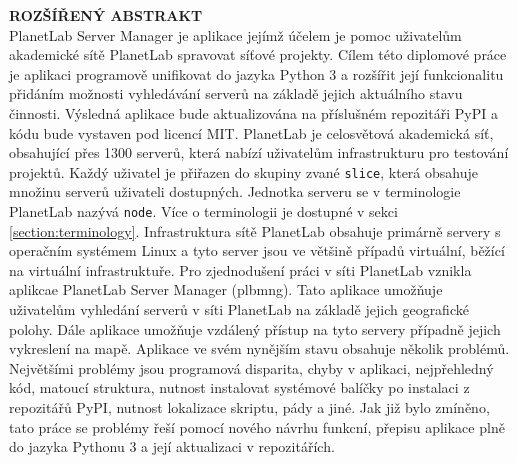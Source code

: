 \documentclass[%
  12pt,       				%
  a4paper,    				%
	unicode,						%
]{report}				    	%
\begin{document}
\cleardoublepage
\noindent
{\large\sffamily\bfseries\MakeUppercase{Rozšířený abstrakt}}
\\
PlanetLab Server Manager je aplikace jejímž účelem je pomoc uživatelům akademické sítě PlanetLab spravovat síťové projekty. Cílem této diplomové práce je aplikaci programově unifikovat do jazyka Python 3 a rozšířit její funkcionalitu přidáním možnosti vyhledávání serverů na základě jejich aktuálního stavu činnosti. Výsledná aplikace bude aktualizována na příslušném repozitáři PyPI a kódu bude vystaven pod licencí MIT. PlanetLab je celosvětová akademická síť, obsahující přes 1300 serverů, která nabízí uživatelům infrastrukturu pro testování projektů. Každý uživatel je přiřazen do skupiny zvané \texttt{slice}, která obsahuje množinu serverů uživateli dostupných. Jednotka serveru se v terminologie PlanetLab nazývá \texttt{node}. Více o terminologii je dostupné v sekci \ref{section:terminology}. Infrastruktura sítě PlanetLab obsahuje primárně servery s operačním systémem Linux a tyto server jsou ve většině případů virtuální, běžící na virtuální infrastruktuře. Pro zjednodušení práci v síti PlanetLab vznikla aplikcae PlanetLab Server Manager (plbmng). Tato aplikace umožňuje uživatelům vyhledání serverů v síti PlanetLab na základě jejich geografické polohy. Dále aplikace umožňuje vzdálený přístup na tyto servery případně jejich vykreslení na mapě. Aplikace ve svém nynějším stavu obsahuje několik problémů. Největšími problémy jsou programová disparita, chyby v aplikaci, nejpřehledný kód, matoucí struktura, nutnost instalovat systémové balíčky po instalaci z repozitářů PyPI, nutnost lokalizace skriptu, pády a jiné. Jak již bylo zmíněno, tato práce se problémy řeší pomocí nového návrhu funkcní, přepisu aplikace plně do jazyka Pythonu 3 a její aktualizaci v repozitářích.
\end{document}
